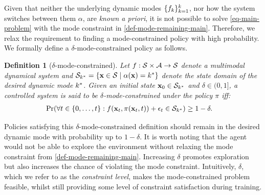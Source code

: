 \documentclass[twoside]{article}
\newtheorem{definition}{Definition}[section]
\newcommand{\modeInd}{\ensuremath{k}}
\newcommand{\ModeInd}{\ensuremath{\MakeUppercase{\modeInd}}}
\newcommand{\mode}[1]{\ensuremath{#1_{\modeInd}}}
\newcommand{\state}{\ensuremath{\mathbf{x}}}
\newcommand{\control}{\ensuremath{\mathbf{u}}}
\newcommand{\modeVar}{\ensuremath{\alpha}}
\newcommand{\latentFunc}{\ensuremath{f}}
\begin{document}
Given that neither the underlying dynamic modes \(\{\mode{\latentFunc}\}_{\modeInd=1}^{\ModeInd}\), nor how the system
switches between them \(\modeVar\), are \emph{known a priori},
it is not possible to solve \cref{eq-main-problem} with the mode constraint in \cref{def-mode-remaining-main}.
Therefore, we relax the requirement to finding a mode-constrained policy with high probability.
We formally define a \(\delta\text{-mode-constrained}\) policy as follows.
\begin{definition}[$\delta$-mode-constrained] \label{def-delta-mode-remaining}
Let $f : \mathcal{S} \times \mathcal{A} \rightarrow \mathcal{S}$ denote a multimodal dynamical system
and $\desiredStateDomain = \{ \state \in \stateDomain \mid \modeVar(\state) = \desiredMode \}$
denote the state domain of the desired dynamic mode $\desiredMode$.
Given an initial state $\state_0 \in \desiredStateDomain$ and $\delta \in (0,1]$,
a controlled system is said to be $\delta$-mode-constrained under the policy $\pi$ iff:
\begin{align} \label{eq-mode-remaining-def-explore}
\Pr( \forall \timeInd \in \{0,\ldots, \TimeInd \} :
\dynamicsFunc(\state_{\timeInd}, \policy(\state_{\timeInd}, \timeInd)) + \epsilon_{\timeInd} &\in \stateDomain_{\desiredMode}) \geq 1 - \delta.
\end{align}
\end{definition}
Policies satisfying this \(\delta\text{-mode-constrained}\) definition
should remain in the desired dynamic mode with probability up to \(1-\delta\).
It is worth noting that the agent would not be able to explore the environment without relaxing the
mode constraint from \cref{def-mode-remaining-main}.
Increasing \(\delta\) promotes exploration but also increases the chance of violating the mode constraint.
Intuitively, \(\delta\), which we refer to as the \emph{constraint level}, makes the mode-constrained problem
feasible, whilst still providing some level of constraint satisfaction during training.
\end{document}
